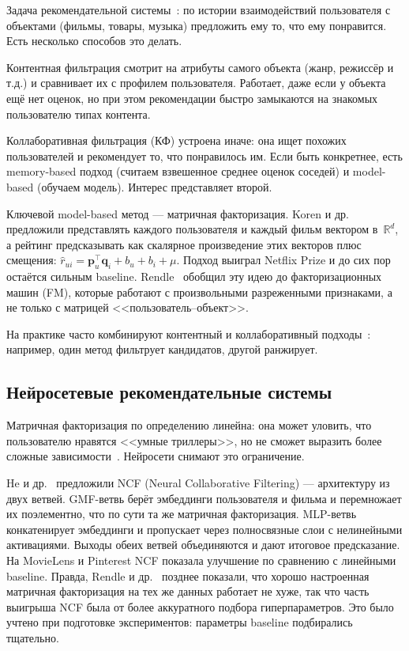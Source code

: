 \documentclass[14pt,a4paper]{extarticle}
\begin{document}
Задача рекомендательной системы~\cite{ricci2015recommender}: по истории взаимодействий пользователя с объектами (фильмы, товары, музыка) предложить ему то, что ему понравится. Есть несколько способов это делать.

Контентная фильтрация смотрит на атрибуты самого объекта (жанр, режиссёр и т.д.) и сравнивает их с профилем пользователя. Работает, даже если у объекта ещё нет оценок, но при этом рекомендации быстро замыкаются на знакомых пользователю типах контента.

Коллаборативная фильтрация (КФ) устроена иначе: она ищет похожих пользователей и рекомендует то, что понравилось им. Если быть конкретнее, есть memory-based подход (считаем взвешенное среднее оценок соседей) и model-based (обучаем модель). Интерес представляет второй.

Ключевой model-based метод --- матричная факторизация. Koren и др.~\cite{koren2009matrix} предложили представлять каждого пользователя и каждый фильм вектором в~$\mathbb{R}^d$, а рейтинг предсказывать как скалярное произведение этих векторов плюс смещения: $\hat{r}_{ui} = \mathbf{p}_u^\top \mathbf{q}_i + b_u + b_i + \mu$. Подход выиграл Netflix Prize и до сих пор остаётся сильным baseline. Rendle~\cite{rendle2010factorization} обобщил эту идею до факторизационных машин (FM), которые работают с произвольными разреженными признаками, а не только с матрицей <<пользователь--объект>>.

На практике часто комбинируют контентный и коллаборативный подходы~\cite{ricci2015recommender}: например, один метод фильтрует кандидатов, другой ранжирует.


\subsection{Нейросетевые рекомендательные системы}

Матричная факторизация по определению линейна: она может уловить, что пользователю нравятся <<умные триллеры>>, но не сможет выразить более сложные зависимости~\cite{goodfellow2016deep}. Нейросети снимают это ограничение.

He и др.~\cite{he2017neural} предложили NCF (Neural Collaborative Filtering) --- архитектуру из двух ветвей. GMF-ветвь берёт эмбеддинги пользователя и фильма и перемножает их поэлементно, что по сути та же матричная факторизация. MLP-ветвь конкатенирует эмбеддинги и пропускает через полносвязные слои с нелинейными активациями. Выходы обеих ветвей объединяются и дают итоговое предсказание. На MovieLens и Pinterest NCF показала улучшение по сравнению с линейными baseline. Правда, Rendle и др.~\cite{rendle2020ncf} позднее показали, что хорошо настроенная матричная факторизация на тех же данных работает не хуже, так что часть выигрыша NCF была от более аккуратного подбора гиперпараметров. Это было учтено при подготовке экспериментов: параметры baseline подбирались тщательно.
\end{document}
